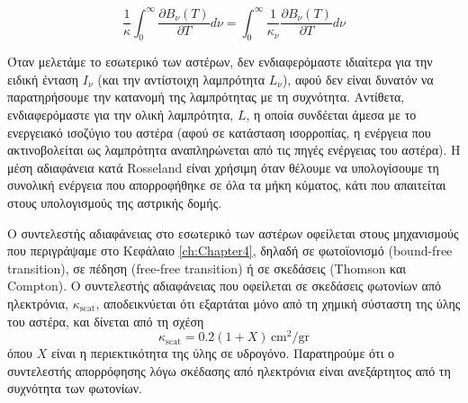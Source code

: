 \begin{equation}
    \label{eq:rosseland_mean_opacity_intensity}
    \boxed{\frac{1}{\kappa} \int_{0}^{\infty} \frac{\partial B_{\nu} (T)}{\partial T} d\nu = \int_{0}^{\infty} \frac{1}{\kappa_\nu} \frac{\partial B_{\nu} (T)}{\partial T} d\nu}
\end{equation}

Όταν μελετάμε το εσωτερικό των αστέρων, δεν ενδιαφερόμαστε ιδιαίτερα για την ειδική ένταση $I_\nu$ (και την αντίστοιχη λαμπρότητα $L_\nu$), αφού δεν είναι δυνατόν να παρατηρήσουμε την κατανομή της λαμπρότητας με τη συχνότητα. Αντίθετα, ενδιαφερόμαστε για την ολική λαμπρότητα, $L$, η οποία συνδέεται άμεσα με το ενεργειακό ισοζύγιο του αστέρα (αφού σε κατάσταση ισορροπίας, η ενέργεια που ακτινοβολείται ως λαμπρότητα αναπληρώνεται από τις πηγές ενέργειας του αστέρα). Η μέση αδιαφάνεια κατά Rosseland είναι χρήσιμη όταν θέλουμε να υπολογίσουμε τη συνολική ενέργεια που απορροφήθηκε σε όλα τα μήκη κύματος, κάτι που απαιτείται στους υπολογισμούς της αστρικής δομής.


Ο συντελεστής αδιαφάνειας στο εσωτερικό των αστέρων οφείλεται στους μηχανισμούς που περιγράψαμε στο Κεφάλαιο \ref{ch:Chapter4}, δηλαδή σε φωτοϊονισμό (bound-free transition), σε πέδηση (free-free transition) ή σε σκεδάσεις (Thomson και Compton). Ο συντελεστής αδιαφάνειας που οφείλεται σε σκεδάσεις φωτονίων από ηλεκτρόνια, $\kappa_{\text{scat}}$, αποδεικνύεται ότι εξαρτάται μόνο από τη χημική σύσταστη της ύλης του αστέρα, και δίνεται από τη σχέση
\begin{equation}
    \label{eq:opacity_scattering}
    \kappa_{\text{scat}} = 0.2 (1+X) \,\text{cm$^2$/gr}
\end{equation}
όπου $X$ είναι η περιεκτικότητα της ύλης σε υδρογόνο. Παρατηρούμε ότι ο συντελεστής απορρόφησης λόγω σκέδασης από ηλεκτρόνια είναι ανεξάρτητος από τη συχνότητα των φωτονίων.

